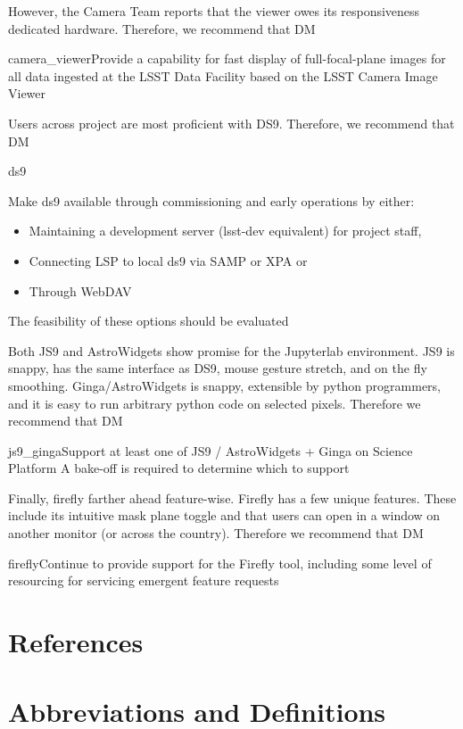 \documentclass[DM,authoryear,toc]{lsstdoc}
\begin{document}
However, the Camera Team reports that the viewer owes its responsiveness dedicated hardware.
Therefore, we recommend that DM
\begin{recommendation}{camera_viewer}{Provide a capability for fast display of full-focal-plane images for all data ingested at the LSST Data Facility based on the LSST Camera Image Viewer}
\end{recommendation}

Users across project are most proficient with DS9. Therefore, we recommend that DM

\begin{recommendation}{ds9}{Make ds9 available through commissioning and early operations by either:
\begin{itemize}
\item{Maintaining a development server (lsst-dev equivalent) for project staff,}
\item{Connecting LSP to local ds9 via SAMP or XPA or}
\item{Through WebDAV}
\end{itemize}}
The feasibility of these options should be evaluated
\end{recommendation}

Both JS9 and AstroWidgets show promise for the Jupyterlab environment.
JS9 is snappy, has the same interface as DS9, mouse gesture stretch, and on the fly smoothing.
Ginga/AstroWidgets is snappy, extensible by python programmers, and it is easy to run arbitrary python code on selected pixels.
Therefore we recommend that DM
\begin{recommendation}{js9_ginga}{Support at least one of JS9 / AstroWidgets + Ginga on Science Platform}
A bake-off is required to determine which to support
\end{recommendation}


Finally, firefly farther ahead feature-wise.
Firefly has a few unique features.
These include its intuitive mask plane toggle and that users can open in a window on another monitor (or across the country).
Therefore we recommend that DM
\begin{recommendation}{firefly}{Continue to provide support for the Firefly tool, including some level of resourcing for servicing emergent feature requests}
\end{recommendation}


\appendix

\section{References}
\label{sec:bib}


\section{Abbreviations and Definitions}
\label{sec:acronyms}

\end{document}
